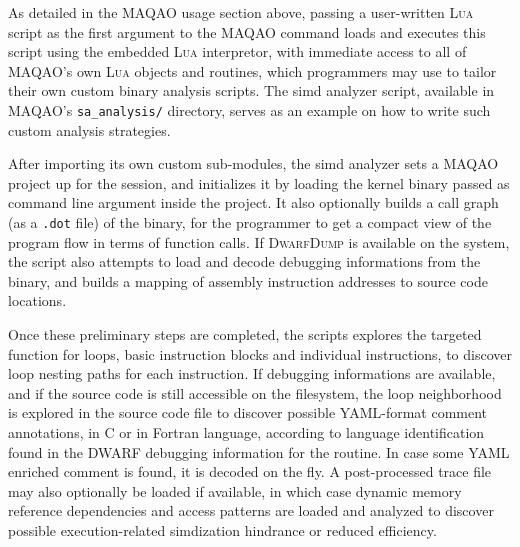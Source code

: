 \documentclass[11pt, a4paper, twoside]{montblanc2}
\def\lua{\textsc{Lua}\xspace}
\def\dd{\textsc{DwarfDump}\xspace}
\begin{document}
As detailed in the MAQAO usage section above, passing a user-written \lua script 
as the first argument to the MAQAO command loads and executes this script using 
the embedded \lua interpretor, with immediate access to all of MAQAO's own \lua objects and 
routines, which programmers may use to tailor their own custom binary analysis 
scripts. The simd analyzer script, available in MAQAO's \verb|sa_analysis/| 
directory, serves as an example on how to write such custom analysis strategies.

After importing its own custom sub-modules, the simd analyzer sets a MAQAO 
project up for the session, and initializes it by loading the kernel binary 
passed as command line argument inside the project. It also optionally builds a call graph 
(as a \verb|.dot| file) of the binary, for the programmer to get a compact 
view of the program flow in terms of function calls. If \dd is available on the 
system, the script also attempts to load and decode debugging informations from 
the binary, and builds a mapping of assembly instruction addresses to source 
code locations.

Once these preliminary steps are completed, the scripts explores the targeted 
function for loops, basic instruction blocks and individual instructions, to 
discover loop nesting paths for each instruction. If debugging informations are 
available, and if the source code is still accessible on the filesystem, the loop 
neighborhood is explored in the source code file to discover possible YAML-format 
comment annotations, in C or in Fortran language, according to language 
identification found in the DWARF debugging information for the routine. In case 
some YAML enriched comment is found, it is decoded on the fly. A post-processed 
trace file may also optionally be loaded if available, in which case dynamic 
memory reference dependencies and access patterns are loaded and analyzed to 
discover possible execution-related simdization hindrance or reduced efficiency.
\end{document}
